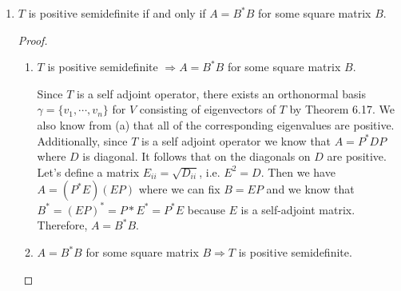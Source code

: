 \documentclass[11pt]{scrartcl}
\begin{document}
\begin{enumerate}[label=\alph*.]
{\begin{proof}
\begin{enumerate}[label=\roman*.]
{			            $(a_1, \cdots, a_n) \Rightarrow$ T is positive definite \par
			            Let $x = \sum_{i = 0}^{n} a_i v_i \in V$. It follows from corollary of Theorem 6.5,
			            \begin{align*}
				            \sum_{i,j}^{n} A_{ij} a_j \overline{a_i} & = \sum_{i,j}^{n}  a_j \overline{a_i} \langle T(v_j),v_i \rangle \\
				                                                     & = \langle T(\sum_{j}^{n} a_j v_j),\sum_{i}^{n} a_i v_i \rangle  \\
				                                                     & = \langle T(x),x \rangle                                        \\
				                                                     & > 0
			            \end{align*}
			            as desired.
			            }
		      \end{enumerate}
		      Therefore, T is positive definite if and only if $\sum_{i,j} A_{ij} a_j \overline{a_i} >0$
		      for all nonzero n-tuples $(a_1, \cdots, a_n)$
	      \end{proof}
	      }
	\item{
	      $T$ is positive semidefinite if and only if $A = B^*B$ for some square matrix $B$.
	      \begin{proof}\
		      \begin{enumerate}[label=\roman*.]
			      \item {
			            $T$ is positive semidefinite $\Rightarrow A = B^*B$ for some square matrix $B$.\par
			            Since $T$ is a self adjoint operator, there exists an orthonormal basis $\gamma = \{v_1, \cdots, v_n\}$ for $V$ consisting of
			            eigenvectors of $T$ by Theorem 6.17. We also know from (a) that all of the corresponding eigenvalues are positive.
			            Additionally, since $T$ is a self adjoint operator we know that $A = P^*DP$ where $D$ is diagonal.
			            It follows that on the diagonals on $D$ are positive. Let's define a matrix $E_{ii} = \sqrt{D_{ii}}$,
			            i.e. $E^2 = D$. Then we have $A = (P^*E)(EP)$ where we can fix $B = EP$ and we know that
			            $B^* = (EP)^* = P*E^* = P^*E$ because $E$ is a self-adjoint matrix. Therefore, $A = B^*B$.
			            }
			      \item {
			            $A = B^*B$ for some square matrix $B \Rightarrow T$ is positive semidefinite. \par
}
\end{enumerate}
\end{proof}}
\end{enumerate}
\end{document}

